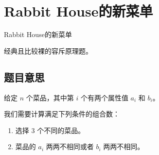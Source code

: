 \def\sectionName{Rabbit House的新菜单}
\section{\sectionName}



\begin{frame}

\isBeamerMode\relax
    {\Huge \sectionName}\par
\fi




经典且比较裸的容斥原理题。



\end{frame}

\subsection{题目意思}
\begin{frame} %
给定 $n$ 个菜品，其中第 $i$ 个有两个属性值 $a_i$ 和 $b_i$。

我们需要计算满足下列条件的组合数：
\begin{enumerate}
    \item 选择 $3$ 个不同的菜品。
    \item 菜品的 $a_i$ 两两不相同或者 $b_i$ 两两不相同。
\end{enumerate}
\end{frame}




